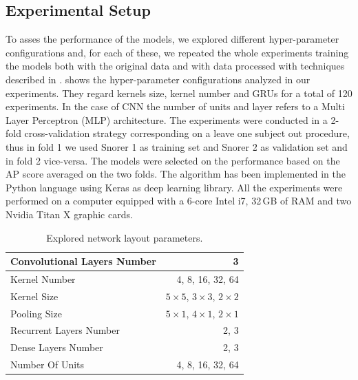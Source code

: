 \subsection{Experimental Setup}
To asses the performance of the models, we explored different hyper-parameter configurations and, for each of these, we repeated the whole experiments training the models both with the original data and  with  data processed with techniques described in .  shows the hyper-parameter configurations analyzed in our experiments. They regard kernels size, kernel number and GRUs for a total of 120 experiments. In the case of CNN the number of units and layer refers to a Multi Layer Perceptron (MLP) architecture. The experiments were conducted in a 2-fold cross-validation strategy corresponding on a leave one subject out procedure, thus in fold 1 we used Snorer 1 as training set and Snorer 2 as validation set and in fold 2 vice-versa. The models were selected on the performance based on the AP score  averaged on the two folds. 
The algorithm has been implemented in the Python language using Keras \cite{chollet2015keras} as deep learning library. All the experiments were performed on a computer equipped with a 6-core Intel i7, 32\,GB of RAM and two Nvidia Titan X graphic cards. 

\begin{table}[ht]
	\centering
	\caption{Explored network layout parameters.}
	\label{CNN-params}
	\begin{tabular}{|l|r|}
		\hline
		Convolutional Layers Number & 3                            \\ \hline
		Kernel Number               & 4, 8, 16, 32, 64                 \\ \hline
		Kernel Size                 & $5\times5$, $3\times3$, $2\times2$ \\ \hline
		Pooling Size                & $5\times1$, $4\times1$, $2\times1$ \\ \hline
		\hline
		Recurrent Layers Number     & 2, 3                            \\ \hline
		Dense Layers Number     & 2, 3                            \\ \hline
		Number Of Units             & 4, 8, 16, 32, 64                 \\ \hline
	\end{tabular}
\end{table}


